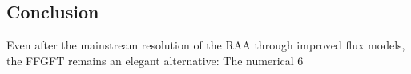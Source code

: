 	\subsection*{Conclusion}
	
	Even after the mainstream resolution of the RAA through improved flux models, the FFGFT remains an elegant alternative: The numerical 6%



